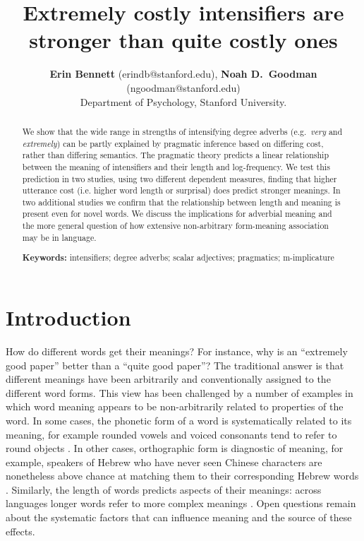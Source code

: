 \documentclass[10pt,letterpaper]{article}
\title{Extremely costly intensifiers are stronger than quite costly ones}
\author{{\large \bf Erin Bennett} (erindb@stanford.edu), {\large \bf Noah D.~Goodman} (ngoodman@stanford.edu)\\
  Department of Psychology, Stanford University.}
\newcommand{\w}[1]{\emph{#1}}
\begin{document}
\maketitle

\begin{abstract}

We show that the wide range in strengths of intensifying degree adverbs (e.g.~\w{very} and \w{extremely}) can be partly explained by pragmatic inference based on differing cost, rather than differing semantics.
The pragmatic theory predicts a linear relationship between the meaning of intensifiers and their length and log-frequency.
We test this prediction in two studies, using two different dependent measures, finding that higher utterance cost (i.e. higher word length or surprisal) does predict stronger meanings.
In two additional studies we confirm that the relationship between length and meaning is present even for novel words.
We discuss the implications for adverbial meaning and the more general question of how extensive non-arbitrary form-meaning association may be in language.

\textbf{Keywords:} 
intensifiers; degree adverbs; scalar adjectives; pragmatics; m-implicature
\end{abstract}

\section{Introduction}

How do different words get their meanings?
For instance, why is an ``extremely good paper'' better than a ``quite good paper''? The traditional answer \cite{saussure} is that different meanings have been arbitrarily and conventionally assigned to the different word forms.
This view has been challenged by a number of examples in which word meaning appears to be non-arbitrarily related to properties of the word.
In some cases, the phonetic form of a word is systematically related to its meaning, for example rounded vowels and voiced consonants tend to refer to round objects \cite{maluma-takete, bouba-kiki, bouba-kiki2, takete-uloomo}. 
In other cases, orthographic form is diagnostic of meaning, for example, speakers of Hebrew who have never seen Chinese characters are nonetheless above chance at matching them to their corresponding Hebrew words \cite{koriat}. 
Similarly, the length of words predicts aspects of their meanings: across languages longer words refer to more complex meanings \cite{lewis}.
Open questions remain about the systematic factors that can influence meaning and the source of these effects.
\end{document}
